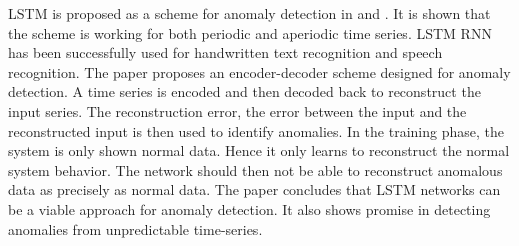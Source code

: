         
        LSTM is proposed as a scheme for anomaly detection in \cite{Malhotra2016} and \cite{Malhotra}. It is shown that the scheme is working for both periodic and aperiodic time series. LSTM RNN has been successfully used for handwritten text recognition and speech recognition. The paper proposes an encoder-decoder scheme designed for anomaly detection. A time series is encoded and then decoded back to reconstruct the input series. The reconstruction error, the error between the input and the reconstructed input is then used to identify anomalies. In the training phase, the system is only shown normal data. Hence it only learns to reconstruct the normal system behavior. The network should then not be able to reconstruct anomalous data as precisely as normal data. The paper concludes that LSTM networks can be a viable approach for anomaly detection. It also shows promise in detecting anomalies from unpredictable time-series.      
        